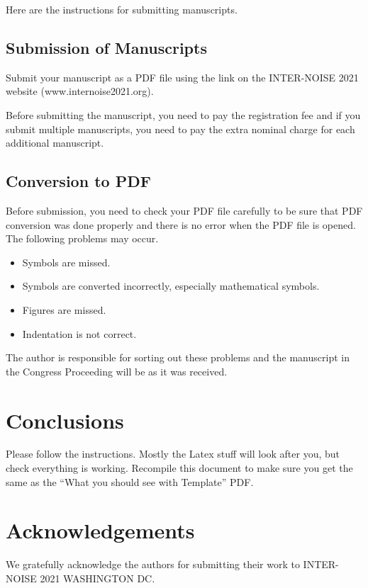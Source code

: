 \noindent
Here are the instructions for submitting manuscripts. 

\subsection{Submission of Manuscripts}

\noindent
Submit your manuscript as a PDF file using the link on the INTER-NOISE 2021 website (www.internoise2021.org). 

Before submitting the manuscript, you need to pay the registration fee and if you submit multiple manuscripts, you need to pay the extra nominal charge for each additional manuscript.

\subsection{Conversion to PDF}

\noindent
Before submission, you need to check your PDF file carefully to be sure that PDF conversion was done properly and there is no error when the PDF file is opened. The following problems may occur.
\begin{itemize}[noitemsep]
\item
Symbols are missed.
\item
Symbols are converted incorrectly, especially mathematical symbols.
\item
Figures are missed.
\item
Indentation is not correct.
\end{itemize}

The author is responsible for sorting out these problems and the manuscript  in the Congress Proceeding will be as it was received.

\section{Conclusions}

\noindent
Please follow the instructions.  Mostly the Latex stuff will look after you, but check everything is working. 
Recompile this document to make sure you get the same as the ``What you should see with Template'' PDF.    

\section*{Acknowledgements} 

\noindent
We gratefully acknowledge the authors for submitting their work to INTER-NOISE 2021 WASHINGTON DC.

